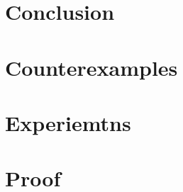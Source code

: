 \documentclass[letterpaper]{article} %
\begin{document}
\section{Conclusion}



\appendix
\section{Counterexamples}
\section{Experiemtns}
\section{Proof}
\end{document}
